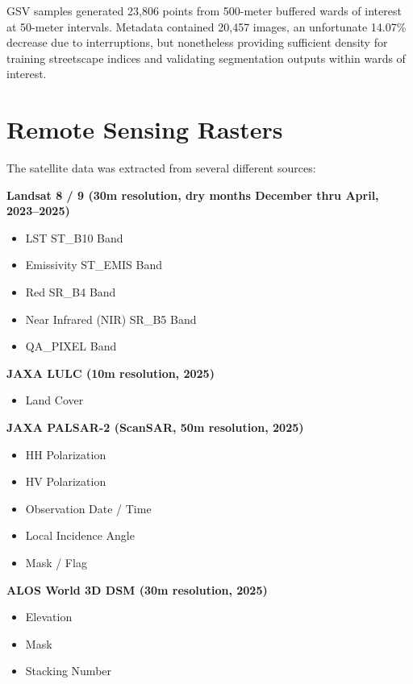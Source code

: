 \documentclass[
]{report}
\providecommand{\tightlist}{%
  \setlength{\itemsep}{0pt}\setlength{\parskip}{0pt}}
\begin{document}
GSV samples generated 23,806 points from 500-meter buffered wards of
interest at 50-meter intervals. Metadata contained 20,457 images, an
unfortunate 14.07\% decrease due to interruptions, but nonetheless
providing sufficient density for training streetscape indices and
validating segmentation outputs within wards of interest.

\section{Remote Sensing Rasters}\label{remote-sensing-rasters}

The satellite data was extracted from several different sources:

\textbf{Landsat 8 / 9 (30m resolution, dry months December thru April,
2023--2025)}

\begin{itemize}
\item
  LST ST\_B10 Band
\item
  Emissivity ST\_EMIS Band
\item
  Red SR\_B4 Band
\item
  Near Infrared (NIR) SR\_B5 Band
\item
  QA\_PIXEL Band
\end{itemize}

\textbf{JAXA LULC (10m resolution, 2025)}

\begin{itemize}
\tightlist
\item
  Land Cover
\end{itemize}

\textbf{JAXA PALSAR-2 (ScanSAR, 50m resolution, 2025)}

\begin{itemize}
\item
  HH Polarization
\item
  HV Polarization
\item
  Observation Date / Time
\item
  Local Incidence Angle
\item
  Mask / Flag
\end{itemize}

\textbf{ALOS World 3D DSM (30m resolution, 2025)}

\begin{itemize}
\item
  Elevation
\item
  Mask
\item
  Stacking Number
\end{itemize}
\end{document}
